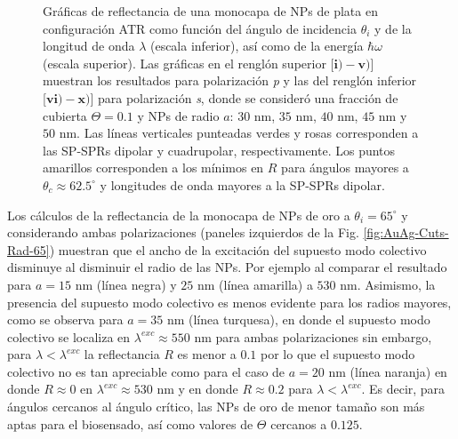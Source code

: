 \begin{figure}[h!]
\vspace*{-.5em}
	\caption{Gráficas de reflectancia de una monocapa de NPs de plata en configuración ATR como función del ángulo de incidencia $\theta_i$ y de la longitud de onda $\lambda$ (escala inferior), así como de la energía  $\hbar\omega$ (escala superior).  Las gráficas   en el renglón superior [$\mathbf{i)-v)}$] muestran los resultados para  polarización \emph{p} y las del renglón inferior  [$\mathbf{vi)-x)}$]  para polarización  \emph{s}, donde se consideró una fracción de cubierta $\Theta = 0.1$ y  NPs de radio  $a$: $30$ nm, $35$ nm, $40$ nm, $45$ nm y $50$ nm.  Las líneas verticales punteadas verdes y rosas corresponden a las SP-SPRs dipolar y  cuadrupolar, respectivamente.  Los puntos amarillos corresponden a los mínimos en $R$ para ángulos mayores a $\theta_c\approx 62.5^\circ$ y longitudes de onda mayores a la SP-SPRs dipolar.
}	\label{fig:Ag-R-Rad}	
	\end{figure}	

Los cálculos de la reflectancia de la monocapa de NPs de oro a $\theta_i=65^\circ$ y considerando ambas polarizaciones (paneles izquierdos de la Fig. \ref{fig:AuAg-Cuts-Rad-65}) muestran que el ancho de la excitación del supuesto modo colectivo disminuye  al disminuir el radio de las NPs. Por ejemplo al comparar el resultado para $a=15$ nm (línea negra) y $25$ nm (línea amarilla) a $530$ nm. Asimismo, la presencia del supuesto modo colectivo es menos evidente para los radios mayores, como se observa para $a=35$ nm (línea turquesa), en donde el supuesto modo colectivo  se localiza en $\lambda^{exc}\approx 550$ nm para ambas polarizaciones sin embargo, para $\lambda<\lambda^{exc}$ la reflectancia $R$ es menor a $0.1$ por lo que el supuesto modo colectivo no es tan apreciable como para el caso de $a=20$ nm (línea naranja) en donde $R\approx 0$ en $\lambda^{exc}\approx 530$ nm y en donde  $R\approx 0.2$ para $\lambda<\lambda^{exc}$. Es decir, para ángulos cercanos al ángulo crítico, las NPs de oro de menor tamaño son más aptas para el biosensado, así como valores de $\Theta$ cercanos a $0.125$.



